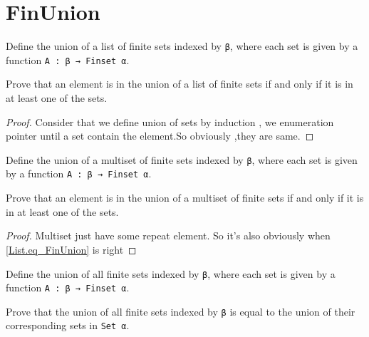 \section{FinUnion}

\begin{definition}\label{List.FinUnion}
  \leanok
  Define the union of a list of finite sets indexed by \verb|β|, where each set is given by a function \verb|A : β → Finset α|.
\end{definition}

\begin{lemma}\label{List.eq_FinUnion}
  Prove that an element is in the union of a list of finite sets if and only if it is in at least one of the sets.
\end{lemma}

\begin{proof}
  \leanok
  Consider that we define union of sets by induction , we enumeration pointer until a set contain the element.So obviously ,they are same.
\end{proof}

\begin{definition}\label{Multiset.FinUnion}
  Define the union of a multiset of finite sets indexed by \verb|β|, where each set is given by a function \verb|A : β → Finset α|.
\end{definition}

\begin{lemma}\label{Multiset.eq_FinUnion}
  Prove that an element is in the union of a multiset of finite sets if and only if it is in at least one of the sets.
\end{lemma}

\begin{proof}
  \leanok
  Multiset just have some repeat element. So it's also obviously when \ref{List.eq_FinUnion} is right
\end{proof}

\begin{definition}\label{FinUnion₀}
  Define the union of all finite sets indexed by \verb|β|, where each set is given by a function \verb|A : β → Finset α|.
\end{definition}

\begin{lemma}\label{eq_FinUnion₀}
  Prove that the union of all finite sets indexed by \verb|β| is equal to the union of their corresponding sets in \verb|Set α|.
\end{lemma}

